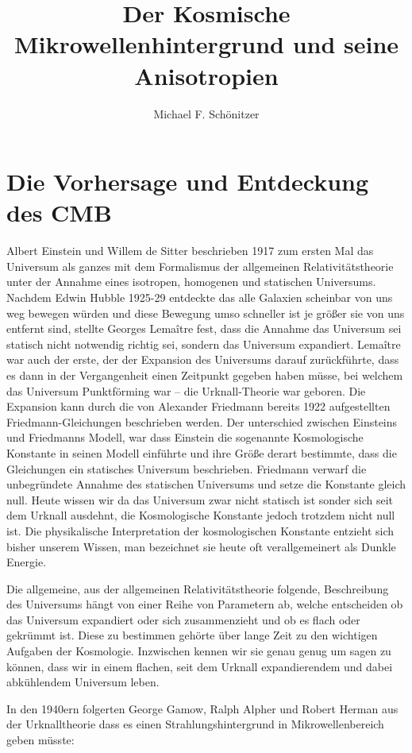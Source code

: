 \documentclass[10pt,a4paper]{article}
\author{Michael F. Schönitzer}
\title{Der Kosmische Mikrowellenhintergrund und seine Anisotropien}
\begin{document}
\maketitle

\section{Die Vorhersage und Entdeckung des CMB}
Albert Einstein und Willem de Sitter beschrieben 1917 zum ersten Mal das Universum als ganzes mit dem Formalismus der allgemeinen Relativitätstheorie unter der Annahme eines isotropen, homogenen und statischen Universums.
Nachdem Edwin Hubble 1925-29 entdeckte das alle Galaxien scheinbar von uns weg bewegen würden und diese Bewegung umso schneller ist je größer sie von uns entfernt sind, stellte Georges Lemaître fest, dass die Annahme das Universum sei statisch nicht notwendig richtig sei, sondern das Universum expandiert. Lemaître war auch der erste, der der Expansion des Universums darauf zurückführte, dass es dann in der Vergangenheit einen Zeitpunkt gegeben haben müsse, bei welchem das Universum Punktförming war -- die Urknall-Theorie war geboren.
Die Expansion kann durch die von Alexander Friedmann bereits 1922 aufgestellten Friedmann-Gleichungen beschrieben werden.
Der unterschied zwischen Einsteins und Friedmanns Modell, war dass Einstein die sogenannte Kosmologische Konstante in seinen Modell einführte und ihre Größe derart bestimmte, dass die Gleichungen ein statisches Universum beschrieben. Friedmann verwarf die unbegründete Annahme des statischen Universums und setze die Konstante gleich null.
Heute wissen wir da das Universum zwar nicht statisch ist sonder sich seit dem Urknall ausdehnt, die Kosmologische Konstante jedoch trotzdem nicht null ist.
Die physikalische Interpretation der kosmologischen Konstante entzieht sich bisher unserem Wissen, man bezeichnet sie heute oft verallgemeinert als Dunkle Energie.

Die allgemeine, aus der allgemeinen Relativitätstheorie folgende, Beschreibung des Universums hängt von einer Reihe von Parametern ab, welche entscheiden ob das Universum expandiert oder sich zusammenzieht und ob es flach oder gekrümmt ist. Diese zu bestimmen gehörte über lange Zeit zu den wichtigen Aufgaben der Kosmologie. Inzwischen kennen wir sie genau genug um sagen zu können, dass wir in einem flachen, seit dem Urknall expandierendem und dabei abkühlendem Universum leben.

In den 1940ern folgerten George Gamow, Ralph Alpher und Robert Herman aus der Urknalltheorie dass es einen Strahlungshintergrund in Mikrowellenbereich geben müsste:
\end{document}
